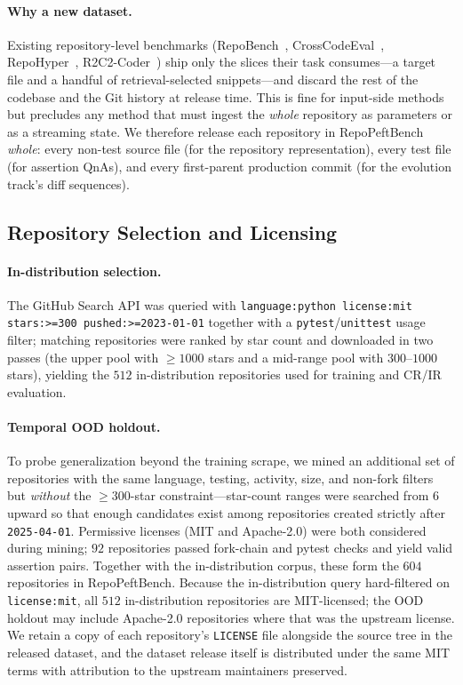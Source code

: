 \documentclass{llmxive}
\providecommand{\repopeftbench}{RepoPeftBench\xspace}
\begin{document}
\paragraph{Why a new dataset.}
Existing repository-level benchmarks (RepoBench~\cite{liu2023repobenchbenchmarkingrepositorylevelcode}, CrossCodeEval~\cite{ding2024crosscodeeval}, RepoHyper~\cite{phan2024repohypersearchexpandrefinesemanticgraphs}, R2C2-Coder~\cite{deng2024r2c2coder}) ship only the slices their task consumes---a target file and a handful of retrieval-selected snippets---and discard the rest of the codebase and the Git history at release time.
This is fine for input-side methods but precludes any method that must ingest the \emph{whole} repository as parameters or as a streaming state.
We therefore release each repository in \repopeftbench{} \emph{whole}: every non-test source file (for the repository representation), every test file (for assertion QnAs), and every first-parent production commit (for the evolution track's diff sequences).

\subsection{Repository Selection and Licensing}
\label{app:dataset:selection}

\paragraph{In-distribution selection.}
The GitHub Search API was queried with \texttt{language:python license:mit stars:>=300 pushed:>=2023-01-01} together with a \texttt{pytest}/\texttt{unittest} usage filter; matching repositories were ranked by star count and downloaded in two passes (the upper pool with $\geq 1000$ stars and a mid-range pool with $300$--$1000$ stars), yielding the $512$ in-distribution repositories used for training and CR/IR evaluation.

\paragraph{Temporal OOD holdout.}
To probe generalization beyond the training scrape, we mined an additional set of repositories with the same language, testing, activity, size, and non-fork filters but \emph{without} the $\geq 300$-star constraint---star-count ranges were searched from $6$ upward so that enough candidates exist among repositories created strictly after \texttt{2025-04-01}.
Permissive licenses (MIT and Apache-2.0) were both considered during mining; $92$ repositories passed fork-chain and pytest checks and yield valid assertion pairs.
Together with the in-distribution corpus, these form the $604$ repositories in \repopeftbench{}.
Because the in-distribution query hard-filtered on \texttt{license:mit}, all $512$ in-distribution repositories are MIT-licensed; the OOD holdout may include Apache-2.0 repositories where that was the upstream license.
We retain a copy of each repository's \texttt{LICENSE} file alongside the source tree in the released dataset, and the dataset release itself is distributed under the same MIT terms with attribution to the upstream maintainers preserved.
\end{document}
